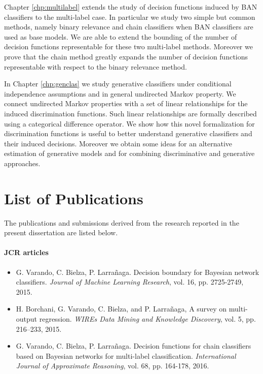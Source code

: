 \documentclass[11pt,a4paper, twoside]{book}
\begin{document}
Chapter \ref{chp:multilabel} extends the study of decision functions induced by BAN classifiers to the multi-label case. In particular we study two simple but common methods, namely binary relevance and chain classifiers when BAN classifiers are used as base models. We are able to extend the bounding of the number of decision functions representable for these two multi-label methods. Moreover we prove that the chain method greatly expands the number of decision functions representable with respect to the binary relevance method.

In Chapter \ref{chp:genclas} we study generative classifiers under conditional independence assumptions and in general undirected Markov property. We connect undirected Markov properties with a set of linear relationships for the induced discrimination functions. Such linear relationships are formally described using a categorical difference operator. We show how this novel formalization for discrimination functions is useful to better understand generative classifiers and their induced decisions. Moreover we obtain some ideas for an alternative estimation of generative models and for combining discriminative and generative approaches. 


\section{List of Publications}

The publications and submissions derived from the research reported in the present dissertation are listed below. 

\paragraph{JCR articles}
\begin{itemize}
\item  G. Varando, C. Bielza, P. Larrañaga. Decision boundary for Bayesian network classifiers. \textit{Journal of Machine Learning Research}, vol. 16, pp. 2725-2749, 2015. 

\item H. Borchani, G. Varando, C. Bielza, and P. Larrañaga, A survey on multi-output regression. \textit{WIREs Data Mining and Knowledge Discovery}, vol. 5, pp. 216--233, 2015.

\item  G. Varando, C. Bielza, P. Larrañaga. Decision functions for chain classifiers based on Bayesian networks for multi-label classification. \textit{International Journal of Approximate Reasoning}, vol. 68, pp. 164-178, 2016.
\end{itemize}
\end{document}
